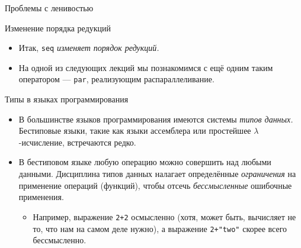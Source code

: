 \documentclass[xcolor=dvipsnames]{beamer}
\begin{document}
\begin{frame}[fragile]{Проблемы с ленивостью}

 
\end{frame}

\begin{frame}{Изменение порядка редукций}
 
 \begin{itemize}[<+->]
  \item Итак, \texttt{seq} {\em изменяет порядок редукций.}
  \item На одной из следующих лекций мы познакомимся с ещё одним таким оператором --- \texttt{par}, реализующим распараллеливание.
 \end{itemize}

\end{frame}

\fi

\begin{frame}[fragile]{Типы в языках программирования}
 
 \begin{itemize}[<+->]
  \item В большинстве языков программирования имеются системы {\em типов данных.} 
  Бестиповые языки, такие как языки ассемблера или простейшее $\lambda$-исчисление, встречаются редко.
  \item В бестиповом языке любую операцию можно совершить над любыми данными. Дисциплина типов данных налагает определённые {\em ограничения} на применение операций (функций), чтобы отсечь {\em бессмысленные} ошибочные применения.
  \begin{itemize}
    \item Например, выражение \texttt{2+2} осмысленно (хотя, может быть, вычисляет не то, что нам на самом деле нужно), а выражение \texttt{2+"two"} скорее всего бессмысленно.
  \end{itemize}
 \end{itemize}

 
\end{frame}
\end{document}

